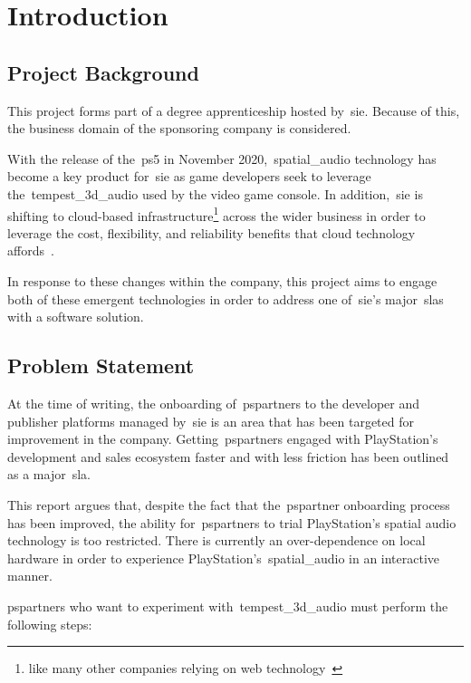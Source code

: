 \thispagestyle{plain}
\newpage
\section{Introduction}\label{sec:introduction}
\subsection{Project Background}\label{subsec:project-background}
\normalsize

This project forms part of a degree apprenticeship hosted by~\gls{sie}.
Because of this, the business domain of the sponsoring company is considered.

With the release of the~\gls{ps5} in November 2020,~\gls{spatial_audio} technology has become a key product for~\gls{sie} as game developers seek to leverage the~\gls{tempest_3d_audio} used by the video game console.
In addition,~\gls{sie} is shifting to cloud-based infrastructure\footnote{like many other companies relying on web technology~\citep{cc_overview}} across the wider business in order to leverage the cost, flexibility, and reliability benefits that cloud technology affords~\citep{cc_overview}.

In response to these changes within the company, this project aims to engage both of these emergent technologies in order to address one of~\gls{sie}'s major~\glspl{sla} with a software solution.

\subsection{Problem Statement}\label{subsec:problem-statement}

At the time of writing,
the onboarding of~\glspl{pspartner} to the developer and publisher platforms
managed by~\gls{sie} is an area that has been targeted for improvement in the company.
Getting~\glspl{pspartner} engaged with PlayStation's development and sales ecosystem faster and with less friction has been outlined as a major~\gls{sla}.

This report argues that, despite the fact that the~\gls{pspartner} onboarding process has been improved, the ability for~\glspl{pspartner} to trial PlayStation's spatial audio technology is too restricted.
There is currently an over-dependence on local hardware in order to experience PlayStation's~\gls{spatial_audio} in an interactive manner.

\glspl{pspartner} who want to experiment with~\gls{tempest_3d_audio} must perform the following steps:

